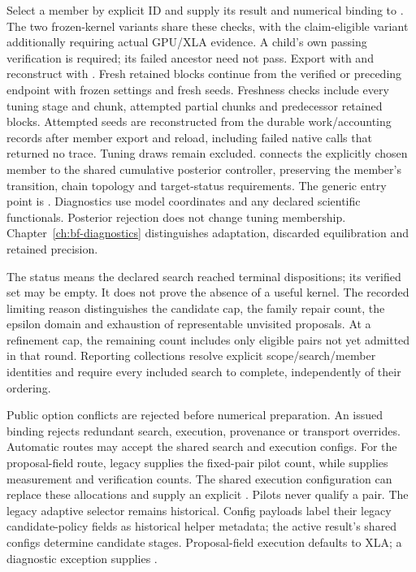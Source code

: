 Select a member by explicit ID and supply its result and numerical binding to
.
The two frozen-kernel variants share these checks, with the claim-eligible
variant additionally requiring actual GPU/XLA evidence. A child's own passing
verification is required; its failed ancestor need not pass. Export with
 and reconstruct with
.
Fresh retained blocks continue from the verified or preceding endpoint with
frozen settings and fresh seeds. Freshness checks include every tuning stage
and chunk, attempted partial chunks and predecessor retained blocks. Attempted
seeds are reconstructed from the durable work/accounting records after member
export and reload, including failed native calls that returned no trace.
Tuning draws remain excluded.
 connects the explicitly chosen member to the
shared cumulative posterior controller, preserving the member's transition,
chain topology and target-status requirements. The generic entry point is
. Diagnostics use model
coordinates and any declared scientific functionals. Posterior rejection does
not change tuning membership. Chapter~\ref{ch:bf-diagnostics} distinguishes
adaptation, discarded equilibration and retained precision.

The status  means the declared search reached terminal
dispositions; its verified set may be empty. It does not prove the absence of a
useful kernel. The recorded limiting reason distinguishes the candidate cap,
the family repair count, the epsilon domain and exhaustion of representable
unvisited proposals. At a refinement cap, the remaining count includes only
eligible pairs not yet admitted in that round. Reporting collections resolve explicit scope/search/member
identities and require every included search to complete, independently of
their ordering.

Public option conflicts are rejected before numerical preparation. An issued
binding rejects redundant search, execution, provenance or transport overrides.
Automatic routes may accept the shared search and execution configs. For the
proposal-field route, legacy  supplies the
fixed-pair pilot count, while  supplies measurement
and verification counts. The shared execution configuration can replace
these allocations and supply an explicit . Pilots never
qualify a pair. The legacy adaptive selector remains historical. Config
payloads label their legacy candidate-policy fields as historical helper
metadata; the active result's shared configs determine candidate stages.
Proposal-field execution defaults to XLA; a diagnostic exception supplies
.

